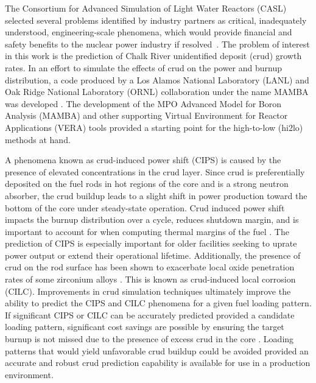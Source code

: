 
The Consortium for Advanced Simulation of Light Water Reactors (CASL) selected several problems identified by industry partners as critical, inadequately understood, engineering-scale phenomena, which would provide financial and safety benefits to the nuclear power industry if resolved~\cite{Turinsky15}. The problem of interest in this work is the prediction of Chalk River unidentified deposit (crud) growth rates. In an effort to simulate the
effects of crud on the power and burnup distribution, a code produced by a Los Alamos National Laboratory (LANL)
and Oak Ridge National Laboratory (ORNL) collaboration under the name MAMBA was developed  \cite{collins16}.
The development of the MPO Advanced Model for Boron Analysis (MAMBA) and other supporting Virtual Environment for Reactor Applications (VERA) tools provided a starting point for the high-to-low (hi2lo) methods at hand.
 

A phenomena known as crud-induced power shift (CIPS) is caused by the presence
of elevated  concentrations in the crud layer.  Since crud is preferentially
deposited on the fuel rods in hot regions of the core and  is a strong neutron absorber, the crud buildup leads to a slight shift in
power production toward the bottom of the core under steady-state operation.
Crud induced power shift impacts the burnup distribution over a cycle, reduces shutdown margin,
and is important to account for when computing thermal
margins of the fuel \cite{lange2017}.  The prediction
of CIPS is especially important for older facilities seeking to uprate power
output or extend their operational lifetime.  Additionally, the presence of crud on the rod surface has been shown
to exacerbate local oxide penetration rates of some zirconium alloys \cite{adamson07}.
This is known as crud-induced local corrosion (CILC).  Improvements in crud
simulation techniques ultimately improve the ability to predict the CIPS and
CILC phenomena for a given fuel loading pattern.  If significant CIPS or CILC can be accurately predicted provided a candidate loading pattern, significant cost savings are possible by ensuring the target burnup is not missed due to the presence of excess crud in the core \cite{lange2017}.  Loading patterns that would yield unfavorable crud buildup could be avoided provided an accurate and robust crud prediction capability is available for use in a production environment.   

